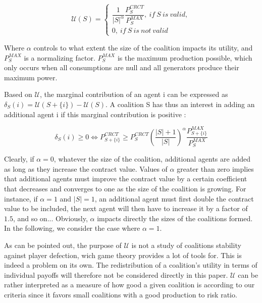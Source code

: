 \documentclass[conference]{IEEEtran}
\begin{document}
\begin{equation}
\mathcal{U}(S) = \left\{ \begin{array}{lll}
							\dfrac{1}{|S|^{\alpha}} \dfrac{ P_{S}^{CRCT} }{P_{S}^{MAX}},\ if\ S\ is\ valid, \\
							0,\ if\ S\ is\ not\ valid
						 \end{array}
				  \right.
\end{equation}

Where $ \alpha $ controls to what extent the size of the coalition impacts its utility, and $ P_{S}^{MAX} $ is a normalizing factor. $ P_{S}^{MAX} $ is the maximum production possible, which only occurs when all consumptions are null and all generators produce their maximum power.

Based on $ \mathcal{U} $, the marginal contribution of an agent i can be expressed as $ \delta_{S}(i) = \mathcal{U}(S+\{i\}) - \mathcal{U}(S) $. A coalition S has thus an interest in adding an additional agent i if this marginal contribution is positive : 

\begin{equation}
\delta_{S}(i) \geq 0 \Leftrightarrow P_{S+\{i\}}^{CRCT} \geq P_{S}^{CRCT} \left( \dfrac{|S|+1}{|S|} \right)^{\alpha} \dfrac{P_{S + \{i\}}^{MAX}}{P_{S}^{MAX}}
\end{equation}

Clearly, if $ \alpha = 0 $, whatever the size of the coalition, additional agents are added as long as they increase the contract value. Values of $\alpha $ greater than zero implies that additional agents must improve the contract value by a certain coefficient that decreases and converges to one as the size of the coalition is growing. For instance, if $\alpha = 1$ and $ |S| = 1 $, an additional agent must first double the contract value to be included, the next agent will then have to increase it by a factor of $ 1.5 $, and so on... Obviously, $ \alpha $ impacts directly the sizes of the coalitions formed. In the following, we consider the case where $ \alpha = 1 $.

As can be pointed out, the purpose of $ \mathcal{U} $ is not a study of coalitions stability against player defection, wich game theory provides a lot of tools for. This is indeed a problem on its own. The redistribution of a coalition's utility in terms of individual payoffs will therefore not be considered directly in this paper. $ \mathcal{U} $ can be rather interpreted as a measure of how good a given coalition is according to our criteria since it favors small coalitions with a good production to risk ratio.
\end{document}
